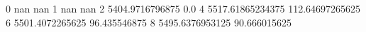 0 nan nan
1 nan nan
2 5404.9716796875 0.0
4 5517.61865234375 112.64697265625
6 5501.4072265625 96.435546875
8 5495.6376953125 90.666015625
